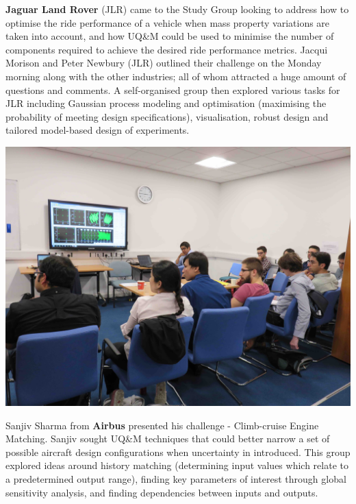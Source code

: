\documentclass[11pt]{article}%
\begin{document}
\begin{minipage}[!t]{.75\linewidth}
\begin{multicols}{2}
{\bf Jaguar Land Rover} (JLR) came to the Study Group looking to address how to optimise the ride performance of a vehicle when mass property variations are taken into account, and how UQ\&M could be used to minimise the number of components required to achieve the desired ride performance metrics. Jacqui Morison and Peter Newbury (JLR) outlined their challenge on the Monday morning along with the other industries; all of whom attracted a huge amount of questions and comments. A self-organised group then explored various tasks for JLR including Gaussian process modeling and optimisation (maximising the probability of meeting design specifications), visualisation, robust design and tailored model-based design of experiments.

\includegraphics[width=0.5 \textwidth]{studygroup/picts/IMG_1592_lr.jpg}

Sanjiv Sharma from {\bf Airbus} presented his challenge - Climb-cruise Engine Matching. Sanjiv sought UQ\&M techniques that could better narrow a set of possible aircraft design configurations when uncertainty in introduced. This group explored ideas around history matching (determining input values which relate to a predetermined output range), finding key parameters of interest through global sensitivity analysis, and finding dependencies between inputs and outputs.







\end{multicols}
\end{minipage}
\end{document}
